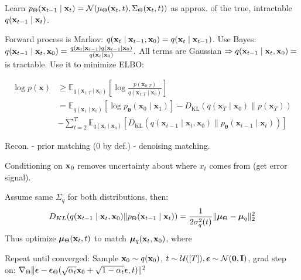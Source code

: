 \begin{definition}[Denoising]
    Learn \(p_\Theta(\vb{x}_{t-1} \mid \vb{x}_{t}) = \operatorname{\mathcal{N}}(\mu_\Theta(\vb{x}_t, t), \Sigma_\Theta(\vb{x}_t, t))\) as approx. of the true, intractable \(q(\vb{x}_{t-1} \mid \vb{x}_t)\). 
    
    Forward process is Markov: \(q(\vb{x}_t \mid \vb{x}_{t-1}, \vb{x}_0) = q(\vb{x}_t \mid \vb{x}_{t-1})\). Use Bayes:
    \(
    q(\vb{x}_{t-1} \mid \vb{x}_t, \vb{x}_0) = \frac{q(\vb{x}_t \mid \vb{x}_{t-1}) q(\vb{x}_{t-1} \mid \vb{x}_0)}{q(\vb{x}_t \mid \vb{x}_0)}.
    \)
    All terms are Gaussian \(\Rightarrow q(\vb{x}_{t-1} \mid \vb{x}_t, \vb{x}_0) = \) is tractable. Use it to minimize ELBO:

    \vspace{-10pt}
    \begin{align*}
        \log p(\boldsymbol{x}) &\geq \mathbb{E}_{q\left(\boldsymbol{x}_{1: T} \mid \boldsymbol{x}_0\right)}\left[\log \frac{p\left(\boldsymbol{x}_{0: T}\right)}{q\left(\boldsymbol{x}_{1: T} \mid \boldsymbol{x}_0\right)}\right] \\
        &=\mathbb{E}_{q\left(\boldsymbol{x}_1 \mid \boldsymbol{x}_0\right)}\left[\log p_{\boldsymbol{\theta}}\left(\boldsymbol{x}_0 \mid \boldsymbol{x}_1\right)\right]-D_{\mathrm{KL}}\left(q\left(\boldsymbol{x}_T \mid \boldsymbol{x}_0\right) \| p\left(\boldsymbol{x}_T\right)\right) \\
        &- \sum_{t=2}^T \mathbb{E}_{q\left(\boldsymbol{x}_t \mid \boldsymbol{x}_0\right)}\left[D_{\mathrm{KL}}\left(q\left(\boldsymbol{x}_{t-1} \mid \boldsymbol{x}_t, \boldsymbol{x}_0\right) \| p_{\boldsymbol{\theta}}\left(\boldsymbol{x}_{t-1} \mid \boldsymbol{x}_t\right)\right)\right]
    \end{align*}
    \begin{center}
    Recon. - prior matching (0 by def.) - denoising matching.
    \end{center}
    Conditioning on \(\vb{x}_0\) removes uncertainty about where \(x_t\) comes from (get error signal).
\end{definition}

\begin{definition}[Training]
    Assume same \(\Sigma_q\) for both distributions, then:
    \[D_{KL}(q(\vb{x}_{t-1} \mid \vb{x}_t, \vb{x}_0) \Vert p_{\Theta}(\vb{x}_{t-1} \mid \vb{x}_t)) = \frac{1}{2\sigma_q^2(t)}\Vert\vb*{\mu}_{\Theta} - \vb*{\mu}_q\Vert_2^2\]
    Thus optimize \(\vb*{\mu}_{\Theta}(\vb{x}_t, t)\) to match \(\vb*{\mu}_q(\vb{x}_t, \vb{x}_0)\), where

    \vspace{-12pt}

    Repeat until converged: Sample \(\vb{x}_0 \sim q(\vb{x}_0)\), \(t \sim \operatorname{\mathcal{U}}([T]), \vb*{\epsilon} \sim \operatorname{\mathcal{N}}(\vb{0}, \vb{I})\), grad step on: \(\nabla_{\Theta} \Vert\vb*{\epsilon} - \vb*{\epsilon}_{\Theta}(\sqrt{\alpha_t}\vb{x}_0 + \sqrt{1 - \alpha_t}\vb*{\epsilon}, t)\Vert^2\)
\end{definition}

